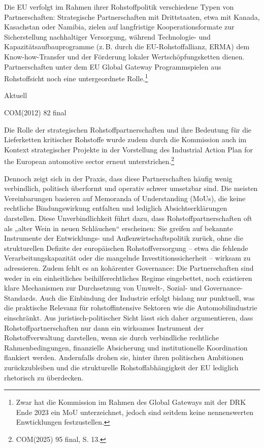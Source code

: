 \documentclass[12pt,a4paper,oneside]{book} %
\begin{document}
Die EU verfolgt im Rahmen ihrer Rohstoffpolitik verschiedene Typen von Partnerschaften: Strategische Partnerschaften mit Drittstaaten, etwa mit Kanada, Kasachstan oder Namibia, zielen auf langfristige Kooperationsformate zur Sicherstellung nachhaltiger Versorgung, während Technologie- und Kapazitätsaufbauprogramme (z. B. durch die EU-Rohstoffallianz, ERMA)  dem Know-how-Transfer und der Förderung lokaler Wertschöpfungsketten dienen. Partnerschaften unter dem EU \glqq Global Gateway Programm\grqq spielen aus Rohstoffsicht noch eine untergeordnete Rolle.\footnote{Zwar hat die Kommission im Rahmen des Global Gateways mit der DRK Ende 2023 ein MoU unterzeichnet, jedoch sind seitdem keine nennenswerten Enwticklungen festzustellen.}

Aktuell 

COM(2012) 82 final 

Die Rolle der strategischen Rohstoffpartnerschaften und ihre Bedeutung für die Lieferketten kritischer Rohstoffe wurde zudem durch die Kommission auch im Kontext strategischer Projekte in der Vorstellung des Industrial Action Plan for the European automotive sector erneut unterstrichen.\footnote{COM(2025) 95 final, S. 13.}


Dennoch zeigt sich in der Praxis, dass diese Partnerschaften häufig wenig verbindlich, politisch überformt und operativ schwer umsetzbar sind. Die meisten Vereinbarungen basieren auf Memoranda of Understanding (MoUs), die keine rechtliche Bindungswirkung entfalten und lediglich Absichtserklärungen darstellen. Diese Unverbindlichkeit führt dazu, dass Rohstoffpartnerschaften oft als „alter Wein in neuen Schläuchen“ erscheinen: Sie greifen auf bekannte Instrumente der Entwicklungs- und Außenwirtschaftspolitik zurück, ohne die strukturellen Defizite der europäischen Rohstoffversorgung – etwa die fehlende Verarbeitungskapazität oder die mangelnde Investitionssicherheit – wirksam zu adressieren. Zudem fehlt es an kohärenter Governance: Die Partnerschaften sind weder in ein einheitliches beihilferechtliches Regime eingebettet, noch existieren klare Mechanismen zur Durchsetzung von Umwelt-, Sozial- und Governance-Standards. Auch die Einbindung der Industrie erfolgt bislang nur punktuell, was die praktische Relevanz für rohstoffintensive Sektoren wie die Automobilindustrie einschränkt. Aus juristisch-politischer Sicht lässt sich daher argumentieren, dass Rohstoffpartnerschaften nur dann ein wirksames Instrument der Rohstoffverwaltung darstellen, wenn sie durch verbindliche rechtliche Rahmenbedingungen, finanzielle Absicherung und institutionelle Koordination flankiert werden. Andernfalls drohen sie, hinter ihren politischen Ambitionen zurückzubleiben und die strukturelle Rohstoffabhängigkeit der EU lediglich rhetorisch zu überdecken.
\end{document}
